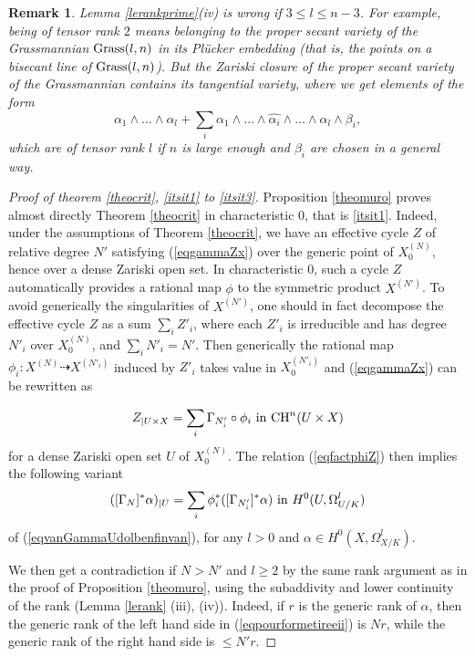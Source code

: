 \documentclass[10pt]{article}
\newtheorem{rema}[theo]{Remark}
\begin{document}
\begin{rema}\label{reamsurlowersemicontpasbon} {\rm Lemma \ref{lerankprime}(iv) is wrong if $3\leq l\leq n-3$. For example, being of tensor rank $2$ means belonging to the proper secant variety of the Grassmannian ${\rm Grass}(l,n)$ in its Pl\"{u}cker embedding (that is, the points on a bisecant line of ${\rm Grass}(l,n)$). But the Zariski closure of the proper secant variety of the Grassmannian contains its tangential variety, where we get  elements of the form
$$\alpha_1\wedge\ldots\wedge \alpha_l+\sum_i\alpha_1\wedge\ldots\wedge\hat{\alpha_i}\wedge\ldots\wedge \alpha_l\wedge \beta_i,$$
which are of tensor rank $l$ if $n$ is large enough and $\beta_i$ are chosen in a general way.}\end{rema}


\begin{proof}[Proof of theorem \ref{theocrit}, \ref{itsit1} to \ref{itsit3}]  Proposition  \ref{theomuro}  proves almost directly Theorem \ref{theocrit} in characteristic $0$, that is \ref{itsit1}. Indeed,  under the assumptions of Theorem \ref{theocrit}, we have an  effective cycle $Z$ of relative degree $N'$  satisfying (\ref{eqgammaZx}) over the generic point of $X^{(N)}_0$, hence over a dense Zariski open set. In characteristic $0$, such a cycle $Z$ automatically provides a rational map $\phi$ to the symmetric product $X^{(N')}$. To avoid generically the singularities of $X^{(N')}$, one should in fact decompose the effective cycle $Z$ as a sum $\sum_i Z'_i$, where each $Z'_i$ is irreducible and has degree $N'_i$ over $X^{(N)}_0$, and $\sum_i N'_i=N'$. Then generically  the rational map $\phi_{i}:X^{(N)}\dashrightarrow X^{(N'_i)}$ induced by $Z'_i$ takes value in $X^{(N'_i)}_0$ and  (\ref{eqgammaZx}) can be rewritten as

  \begin{eqnarray}\label{eqfactphiZ} Z_{\mid U\times X}=\sum_i \Gamma_{N'_i}\circ \phi_i\,\,{\rm in}\,\,{\rm CH}^n(U\times X)\end{eqnarray} for a dense Zariski open set $U$ of $X^{(N)}_0$. The relation  (\ref{eqfactphiZ}) then implies the following variant
   \begin{eqnarray}\label{eqpourformetireeii} ([\Gamma_{N}]^*\alpha)_{\mid U}=\sum_i \phi_i^*([\Gamma_{N'_i}]^*\alpha)\,\,{\rm in}\,\,H^0(U,\Omega_{U/K}^l)\end{eqnarray}
   of (\ref{eqvanGammaUdolbenfinvan}),
for any $l>0$ and $\alpha\in  H^0(X,\Omega_{X/K}^{l})$.

We then get a contradiction if $N>N'$ and $l\geq 2$  by the same  rank argument as in the proof of Proposition \ref{theomuro}, using the subaddivity and lower continuity of the rank (Lemma \ref{lerank} (iii), (iv)). Indeed, if $r$ is the generic rank of $\alpha$, then the generic rank of the left hand side in (\ref{eqpourformetireeii}) is $Nr$, while the generic rank of the right hand side is $\leq N'r$.


\end{proof}
\end{document}
